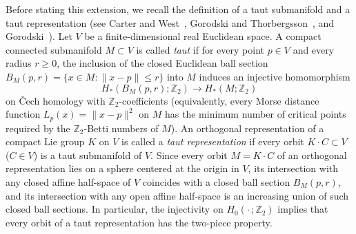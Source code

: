 \documentclass[11pt,reqno]{amsart}
\theoremstyle{remark}
\newcommand{\Z}{\mathbb Z}
\begin{document}
Before stating this extension, we recall the definition of a taut
submanifold and a taut representation (see Carter and
West~\cite[page~707]{CarterWest1972}, Gorodski and
Thorbergsson~\cite[page~187]{GorodskiThorbergsson2003}, and
Gorodski~\cite[Sections~2--3, pages~62--65]{Gorodski2006}). Let $V$ be a
finite-dimensional real Euclidean space. A compact connected submanifold
$M\subset V$ is called \emph{taut} if for every point $p\in V$ and every
radius $r\ge0$, the inclusion of the closed Euclidean ball section
$B_M(p,r)=\{x\in M:\|x-p\|\le r\}$ into $M$ induces an injective
homomorphism
\[
 H_*(B_M(p,r);\Z_2)\longrightarrow H_*(M;\Z_2)
\]
on \v{C}ech homology with $\Z_2$-coefficients (equivalently, every Morse
distance function $L_p(x)=\|x-p\|^2$ on $M$ has the minimum number of
critical points required by the $\Z_2$-Betti numbers of $M$). An
orthogonal representation of a compact Lie group $K$ on $V$ is called a
\emph{taut representation} if every orbit $K\cdot C\subset V$ ($C\in V$)
is a taut submanifold of $V$. Since every orbit $M=K\cdot C$ of an
orthogonal representation lies on a sphere centered at the origin in
$V$, its intersection with any closed affine half-space of $V$ coincides
with a closed ball section $B_M(p,r)$, and its intersection with any
open affine half-space is an increasing union of such closed ball
sections. In particular, the injectivity on $H_0(\cdot\,;\Z_2)$ implies
that every orbit of a taut representation has the two-piece property.
\end{document}
